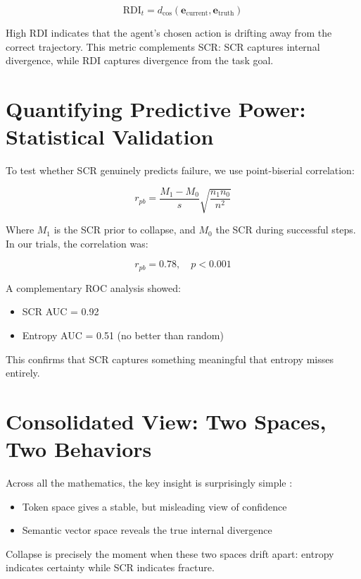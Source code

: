 \documentclass[12pt,a4paper]{report}
\begin{document}
\begin{equation}
\text{RDI}_t = d_{\cos}(\mathbf{e}_{\text{current}}, \mathbf{e}_{\text{truth}})
\end{equation}

High RDI indicates that the agent’s chosen action is drifting away from the correct trajectory. This metric complements SCR: SCR captures internal divergence, while RDI captures divergence from the task goal.

\section{Quantifying Predictive Power: Statistical Validation}
To test whether SCR genuinely predicts failure, we use point-biserial correlation:

\begin{equation}
r_{pb} = \frac{M_1 - M_0}{s} \sqrt{\frac{n_1 n_0}{n^2}}
\end{equation}

Where $M_1$ is the SCR prior to collapse, and $M_0$ the SCR during successful steps. In our trials, the correlation was:

\begin{equation}
r_{pb} = 0.78, \quad p < 0.001
\end{equation}

A complementary ROC analysis showed:
\begin{itemize}
    \item SCR AUC = 0.92
    \item Entropy AUC = 0.51 (no better than random)
\end{itemize}

This confirms that SCR captures something meaningful that entropy misses entirely.

\section{Consolidated View: Two Spaces, Two Behaviors}
Across all the mathematics, the key insight is surprisingly simple \cite{Zhou2024Consistency, Barber2022ConformalPrediction}:
\begin{itemize}
    \item Token space gives a stable, but misleading view of confidence
    \item Semantic vector space reveals the true internal divergence
\end{itemize}

Collapse is precisely the moment when these two spaces drift apart: entropy indicates certainty while SCR indicates fracture.
\end{document}
